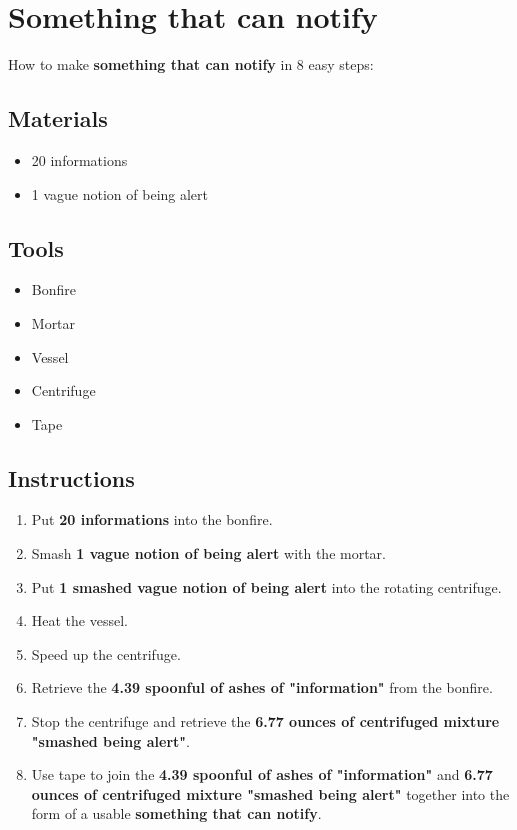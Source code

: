 \documentclass{article}
\begin{document}
\section{Something that can notify}How to make \textbf{something that can notify} in 8 easy steps:

\subsection{Materials}\begin{itemize}
\item 
20 informations
\item 
1 vague notion of being alert
\end{itemize}
\subsection{Tools}\begin{itemize}
\item 
Bonfire
\item 
Mortar
\item 
Vessel
\item 
Centrifuge
\item 
Tape
\end{itemize}
\subsection{Instructions}\begin{enumerate}
\item 
Put \textbf{20 informations} into the bonfire.
\item 
Smash \textbf{1 vague notion of being alert} with the mortar.
\item 
Put \textbf{1 smashed vague notion of being alert} into the rotating centrifuge.
\item 
Heat the vessel.
\item 
Speed up the centrifuge.
\item 
Retrieve the \textbf{4.39 spoonful of ashes of "information"} from the bonfire.
\item 
Stop the centrifuge and retrieve the \textbf{6.77 ounces of centrifuged mixture "smashed being alert"}.
\item 
Use tape to join the \textbf{4.39 spoonful of ashes of "information"} and \textbf{6.77 ounces of centrifuged mixture "smashed being alert"} together into the form of a usable \textbf{something that can notify}.
\end{enumerate}
\newpage
\end{document}
